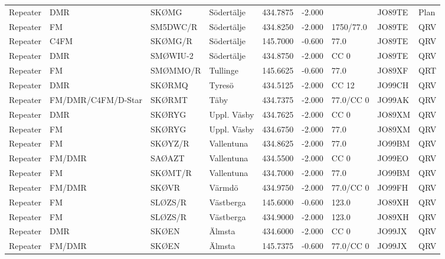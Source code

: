 \begin{landscape}
\begin{longtable}{llllrrlll}
	Repeater          & DMR                & SKØMG    & Södertälje      &     434.7875 &     -2.000 &            & JO89TE      & Plan     \\
	Repeater          & FM                 & SM5DWC/R & Södertälje      &     434.8250 &     -2.000 & 1750/77.0  & JO89TE      & QRV      \\
	Repeater          & C4FM               & SKØMG/R  & Södertälje      &     145.7000 &     -0.600 & 77.0       & JO89TE      & QRV      \\
	Repeater          & DMR                & SMØWIU-2 & Södertälje      &     434.8750 &     -2.000 & CC 0       & JO89TE      & QRV      \\
	Repeater          & FM                 & SMØMMO/R & Tullinge        &     145.6625 &     -0.600 & 77.0       & JO89XF      & QRT      \\
	Repeater          & DMR                & SKØRMQ   & Tyresö          &     434.5125 &     -2.000 & CC 12      & JO99CH      & QRV      \\
	Repeater          & FM/DMR/C4FM/D-Star & SKØRMT   & Täby            &     434.7375 &     -2.000 & 77.0/CC 0  & JO99AK      & QRV      \\
	Repeater          & DMR                & SKØRYG   & Uppl. Väsby     &     434.7625 &     -2.000 & CC 0       & JO89XM      & QRV      \\
	Repeater          & FM                 & SKØRYG   & Uppl. Väsby     &     434.6750 &     -2.000 & 77.0       & JO89XM      & QRV      \\
	Repeater          & FM                 & SKØYZ/R  & Vallentuna      &     434.8625 &     -2.000 & 77.0       & JO99BM      & QRV      \\
	Repeater          & FM/DMR             & SAØAZT   & Vallentuna      &     434.5500 &     -2.000 & CC 0       & JO99EO      & QRV      \\
	Repeater          & FM                 & SKØMT/R  & Vallentuna      &     434.7000 &     -2.000 & 77.0       & JO99BM      & QRV      \\
	Repeater          & FM/DMR             & SKØVR    & Värmdö          &     434.9750 &     -2.000 & 77.0/CC 0  & JO99FH      & QRV      \\
	Repeater          & FM                 & SLØZS/R  & Västberga       &     145.6000 &     -0.600 & 123.0      & JO89XH      & QRV      \\
	Repeater          & FM                 & SLØZS/R  & Västberga       &     434.9000 &     -2.000 & 123.0      & JO89XH      & QRV      \\
	Repeater          & DMR                & SKØEN    & Älmsta          &     434.6000 &     -2.000 & CC 0       & JO99JX      & QRV      \\
	Repeater          & FM/DMR             & SKØEN    & Älmsta          &     145.7375 &     -0.600 & 77.0/CC 0  & JO99JX      & QRV
\end{longtable}



\end{landscape}
